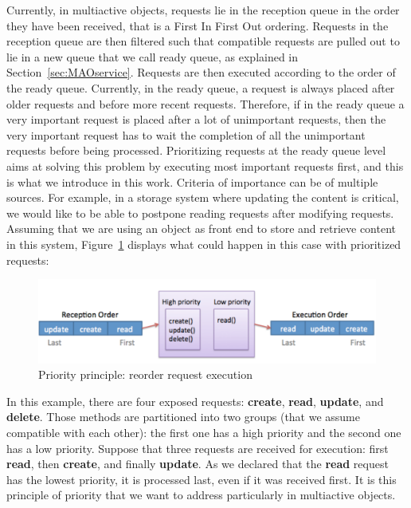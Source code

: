 \documentclass[11pt]{report}
\begin{document}
Currently, in multiactive objects, requests lie in the reception queue in the order they have been received, that is a First In First Out ordering. Requests in the reception queue are then filtered such that compatible requests are pulled out to lie in a new queue that we call ready queue, as explained in Section~\ref{sec:MAOservice}. Requests are then executed according to the order of the ready queue. Currently, in the ready queue, a request is always placed after older requests and before more recent requests. Therefore, if in the ready queue a very important request is placed after a lot of unimportant requests, then the very important request has to wait the completion of all the unimportant requests before being processed. Prioritizing requests at the ready queue level aims at solving this problem by executing most important requests first, and this is what we introduce in this work. Criteria of importance can be of multiple sources. For example, in a storage system where updating the content is critical, we would like to be able to postpone reading requests after modifying requests. Assuming that we are using an object as front end to store and retrieve content in this system, Figure~\ref{fig:priority_principle} displays what could happen in this case with prioritized requests:

\begin{figure}[ht]
      \begin{minipage}[c]{\textwidth}
      \centering
      \includegraphics[scale=0.5]{pictures/priority_principle.pdf}
      \end{minipage}
      \caption{Priority principle: reorder request execution}
      \label{fig:priority_principle}
\end{figure}

In this example, there are four exposed requests: \textbf{create}, \textbf{read}, \textbf{update}, and \textbf{delete}. Those methods are partitioned into two groups (that we assume compatible with each other): the first one has a high priority and the second one has a low priority. Suppose that three requests are received for execution: first \textbf{read}, then \textbf{create}, and finally \textbf{update}. As we declared that the \textbf{read} request has the lowest priority, it is processed last, even if it was received first. It is this principle of priority that we want to address particularly in multiactive objects.
\end{document}
